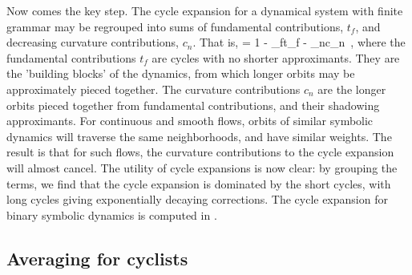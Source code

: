 \documentclass[aps,pre,
                showpacs,
                twocolumn,
                groupedaddress,
                floatfix]{revtex4-1}
\begin{document}
Now comes the key step. The cycle expansion for a dynamical system with
finite grammar may be regrouped into sums of fundamental contributions,
$t_{f}$, and decreasing curvature contributions, $c_{n}$. That is,
\beq
{} = 1 - \sum_{f}t_{f} - \sum_{n}c_{n}
\,,
where the fundamental contributions $t_{f}$ are cycles with no shorter
approximants. They are the 'building blocks' of the dynamics, from which
longer orbits may be approximately pieced together. The curvature
contributions $c_{n}$ are the longer orbits pieced together from
fundamental contributions, and their shadowing approximants. For
continuous and smooth flows, orbits of similar symbolic dynamics will
traverse the same neighborhoods, and have similar weights. The result is
that for such flows, the curvature contributions to the cycle expansion
will almost cancel. The utility of cycle expansions is now clear: by
grouping the terms, we find that the cycle expansion is dominated by the
short cycles, with long cycles giving exponentially decaying corrections.
The cycle expansion for binary symbolic dynamics is computed in
.

\subsection{Averaging for cyclists}
\label{sect:AverCycl}
\end{document}
